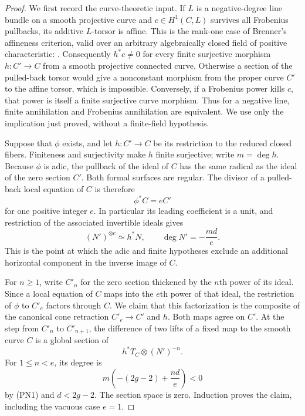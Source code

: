 \begin{proof}
We first record the curve-theoretic input.  If $L$ is a negative-degree
line bundle on a smooth projective curve and
$c\in H^1(C,L)$ survives all Frobenius pullbacks, its additive $L$-torsor
is affine.  This is the rank-one case of Brenner's affineness criterion,
valid over an arbitrary algebraically closed field of positive
characteristic: \cite[Proposition 2.1, preprint pp.~5--6]{C_Brenner2006}.
Consequently $h^*c\ne0$ for every finite surjective morphism
$h:C'\to C$ from a smooth projective connected curve.  Otherwise a
section of the pulled-back torsor would give a nonconstant morphism
from the proper curve $C'$ to the affine torsor, which is impossible.
Conversely, if a Frobenius power kills $c$, that power is itself a
finite surjective curve morphism.  Thus for a negative line, finite
annihilation and Frobenius annihilation are equivalent.  We use only
the implication just proved, without a finite-field hypothesis.

Suppose that $\phi$ exists, and let $h:C'\to C$ be its restriction to
the reduced closed fibers.  Finiteness and surjectivity make $h$ finite
surjective; write $m=\deg h$.  Because $\phi$ is adic, the pullback of
the ideal of $C$ has the same radical as the ideal of the zero section
$C'$.  Both formal surfaces are regular.  The divisor of a pulled-back
local equation of $C$ is therefore
\[
                         \phi^*C=eC'
\]
for one positive integer $e$.  In particular its leading coefficient
is a unit, and restriction of the associated invertible ideals gives
\[
                    (N')^{\otimes e}\simeq h^*N,
             \qquad \deg N'=-\frac{md}{e}.             \tag{PN1}
\]
This is the point at which the adic and finite hypotheses exclude an
additional horizontal component in the inverse image of $C$.

For $n\geq1$, write $C'_n$ for the zero section thickened by the
$n$th power of its ideal.  Since a local equation of $C$ maps into
the $e$th power of that ideal, the restriction of $\phi$ to $C'_e$
factors through $C$.  We claim that this factorization is the composite
of the canonical cone retraction $C'_e\to C'$ and $h$.
Both maps agree on $C'$.  At the step from $C'_n$ to $C'_{n+1}$,
the difference of two lifts of a fixed map to the smooth curve $C$
is a global section of
\[
                       h^*T_C\otimes(N')^{-n}.
\]
For $1\leq n<e$, its degree is
\[
               m\left(-(2g-2)+\frac{nd}{e}\right)<0
\]
by (PN1) and $d<2g-2$.  The section space is zero.  Induction proves
the claim, including the vacuous case $e=1$.


\end{proof}
